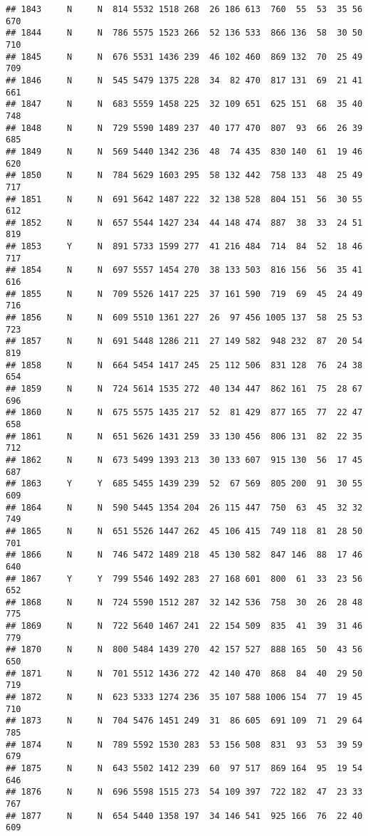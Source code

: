 \documentclass[]{article}
\begin{document}
\begin{verbatim}
## 1843     N     N  814 5532 1518 268  26 186 613  760  55  53  35 56  670
## 1844     N     N  786 5575 1523 266  52 136 533  866 136  58  30 50  710
## 1845     N     N  676 5531 1436 239  46 102 460  869 132  70  25 49  709
## 1846     N     N  545 5479 1375 228  34  82 470  817 131  69  21 41  661
## 1847     N     N  683 5559 1458 225  32 109 651  625 151  68  35 40  748
## 1848     N     N  729 5590 1489 237  40 177 470  807  93  66  26 39  685
## 1849     N     N  569 5440 1342 236  48  74 435  830 140  61  19 46  620
## 1850     N     N  784 5629 1603 295  58 132 442  758 133  48  25 49  717
## 1851     N     N  691 5642 1487 222  32 138 528  804 151  56  30 55  612
## 1852     N     N  657 5544 1427 234  44 148 474  887  38  33  24 51  819
## 1853     Y     N  891 5733 1599 277  41 216 484  714  84  52  18 46  717
## 1854     N     N  697 5557 1454 270  38 133 503  816 156  56  35 41  616
## 1855     N     N  709 5526 1417 225  37 161 590  719  69  45  24 49  716
## 1856     N     N  609 5510 1361 227  26  97 456 1005 137  58  25 53  723
## 1857     N     N  691 5448 1286 211  27 149 582  948 232  87  20 54  819
## 1858     N     N  664 5454 1417 245  25 112 506  831 128  76  24 38  654
## 1859     N     N  724 5614 1535 272  40 134 447  862 161  75  28 67  696
## 1860     N     N  675 5575 1435 217  52  81 429  877 165  77  22 47  658
## 1861     N     N  651 5626 1431 259  33 130 456  806 131  82  22 35  712
## 1862     N     N  673 5499 1393 213  30 133 607  915 130  56  17 45  687
## 1863     Y     Y  685 5455 1439 239  52  67 569  805 200  91  30 55  609
## 1864     N     N  590 5445 1354 204  26 115 447  750  63  45  32 32  749
## 1865     N     N  651 5526 1447 262  45 106 415  749 118  81  28 50  701
## 1866     N     N  746 5472 1489 218  45 130 582  847 146  88  17 46  640
## 1867     Y     Y  799 5546 1492 283  27 168 601  800  61  33  23 56  652
## 1868     N     N  724 5590 1512 287  32 142 536  758  30  26  28 48  775
## 1869     N     N  722 5640 1467 241  22 154 509  835  41  39  31 46  779
## 1870     N     N  800 5484 1439 270  42 157 527  888 165  50  43 56  650
## 1871     N     N  701 5512 1436 272  42 140 470  868  84  40  29 50  719
## 1872     N     N  623 5333 1274 236  35 107 588 1006 154  77  19 45  710
## 1873     N     N  704 5476 1451 249  31  86 605  691 109  71  29 64  785
## 1874     N     N  789 5592 1530 283  53 156 508  831  93  53  39 59  679
## 1875     N     N  643 5502 1412 239  60  97 517  869 164  95  19 54  646
## 1876     N     N  696 5598 1515 273  54 109 397  722 182  47  23 33  767
## 1877     N     N  654 5440 1358 197  34 146 541  925 166  76  22 40  609

\end{verbatim}
\end{document}
